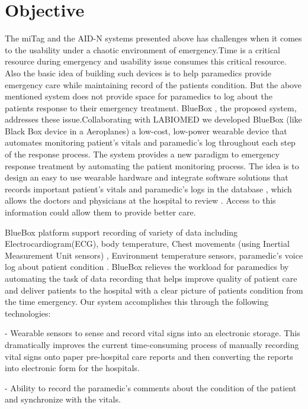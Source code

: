 \section{Objective}
The miTag and the AID-N systems presented above has challenges when it comes to the usability under a chaotic environment of emergency.Time is a critical resource during emergency and usability issue consumes this critical resource. Also the basic idea of building such devices is to help paramedics provide emergency care while maintaining record of the patients condition. But the above mentioned system does not provide space for paramedics to log about the patients response to their emergency treatment. BlueBox , the proposed system, addresses these issue.Collaborating with LABIOMED we developed BlueBox (like Black Box device in a Aeroplanes) a low-cost, low-power wearable device that automates monitoring patient’s vitals and paramedic's log throughout each step of the response process.  The system provides a new paradigm to emergency response treatment by automating the patient monitoring process. The idea is to design an easy to use wearable hardware and integrate software solutions that records important  patient’s vitals and paramedic's logs in the database , which allows the doctors and physicians at the hospital to review . Access to this information could allow them to provide better care.

BlueBox  platform support recording of variety of data including Electrocardiogram(ECG), body temperature, Chest movements (using Inertial Measurement Unit sensors) , Environment temperature sensors, paramedic’s voice log about patient condition . BlueBox relieves the workload for paramedics by automating the task of data recording that helps improve quality of patient care and deliver patients to the hospital with a clear picture of patients condition from the time emergency. Our system accomplishes this through the following technologies:


-	Wearable sensors to sense and record vital signs into an electronic storage. This dramatically improves the current time-consuming process of manually recording vital signs onto paper pre-hospital care reports and then converting the reports into electronic form for the hospitals.


-	Ability to record the paramedic’s comments about the condition of the patient and synchronize with the vitals.

